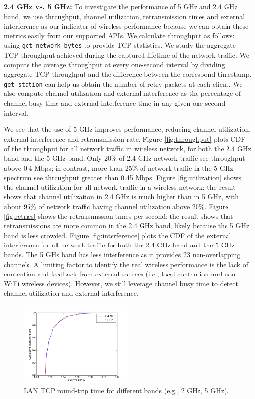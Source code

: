 \textbf{2.4 GHz vs. 5 GHz:} To investigate the performance of 5 GHz and 2.4 GHz band, we use throughput, channel utilization, retransmission times and external interference as our indicator of wireless performance because we can obtain these metrics easily from our supported APIs. We calculate throughput as follows: using \texttt{get\_network\_bytes} to provide TCP statistics. We study the aggregate TCP throughput achieved during the captured lifetime of the network traffic. We compute the average throughput at every one-second interval by  dividing aggregate TCP throughput and the difference between the correspond timestamp. \texttt{get\_station} can help us obtain the number of retry packets at each client. We also compute channel utilization and external interference as the percentage of channel busy time and external interference time in any given one-second interval.

We see that the use of 5 GHz improves performance, reducing channel utilization, external interference and retransmission rate. Figure \ref{fig:throughput} plots CDF of the throughput for all network traffic in wireless network, for both the 2.4 GHz band and the 5 GHz band. Only 20\% of 2.4 GHz network traffic see throughput above 0.4 Mbps; in contrast, more than 25\% of network traffic in the 5 GHz spectrum see throughput greater than 0.45 Mbps. Figure \ref{fig:utilization} shows the channel utilization for all network traffic in a wireless network; the result shows that channel utilization in 2.4 GHz is much higher than in 5 GHz, with about 95\% of network traffic having channel utilization above 20\%. Figure \ref{fig:retries} shows the retransmission times per second; the result shows that retransmissions are more common in the 2.4 GHz band, likely because the 5 GHz band is less crowded. Figure \ref{fig:interference} plots the CDF of the external interference for all network traffic for both the 2.4 GHz band and the 5 GHz bands. The 5 GHz band has less interference as it provides 23 non-overlapping channels. A limiting factor to identify the real wireless performance is the lack of contention and feedback from external sources (i.e., local contention and non-WiFi wireless devices). However, we still leverage channel busy time to detect channel utilization and external interference.

\begin{figure}
\centering
\includegraphics[width=0.5\textwidth]{figure/tcp_rtt.png}
\caption{LAN TCP round-trip time for different bands (e.g., 2 GHz, 5 GHz).}
\label{fig:tcprtt}
\end{figure}

